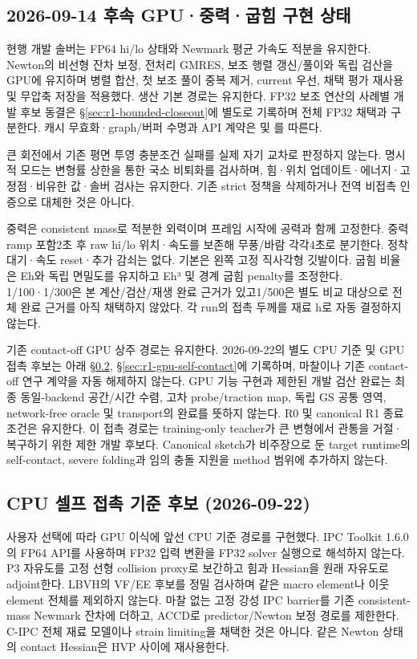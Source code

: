 \documentclass[10pt]{article}
\begin{document}
\subsection{2026-09-14 후속 GPU·중력·굽힘 구현 상태}
\label{sec:r1-gpu-gravity-update}
현행 개발 솔버는 FP64 hi/lo 상태와 Newmark 평균 가속도 적분을 유지한다.
Newton의 비선형 잔차 보정, 전처리 GMRES, 보조 행렬 갱신/풀이와 독립 검산을 GPU에 유지하며
병렬 합산, 첫 보조 풀이 중복 제거, current 우선, 채택 평가 재사용 및 무압축 저장을 적용했다.
생산 기본 경로는 유지한다. FP32 보조 연산의 사례별 개발 후보 동결은
\S\ref{sec:r1-bounded-closeout}에 별도로 기록하며 전체 FP32 채택과 구분한다.
캐시 무효화·graph/버퍼 수명과 API 계약은  및
를 따른다.

큰 회전에서 기존 평면 투영 충분조건 실패를 실제 자기 교차로 판정하지 않는다.
명시적  모드는 변형률 상한을 통한 국소 비퇴화를 검사하며,
힘·위치 업데이트·에너지·고정점·비유한 값·솔버 검사는 유지한다.
기존 strict 정책을 삭제하거나 전역 비접촉 인증으로 대체한 것은 아니다.

중력은 consistent mass로 적분한 외력이며 프레임 시작에 공력과 함께 고정한다.
중력 ramp 포함2초 후 raw hi/lo 위치·속도를 보존해 무풍/바람 각각4초로 분기한다.
정착 대기·속도 reset·추가 감쇠는 없다. 기본은 왼쪽 고정 직사각형 깃발이다.
굽힘 비율은 Eh와 독립 면밀도를 유지하고 Eh³ 및 경계 굽힘 penalty를 조정한다.
1/100·1/300은 본 계산/검산/재생 완료 근거가 있고1/500은 별도 비교 대상으로
전체 완료 근거를 아직 채택하지 않았다. 각 run의 접촉 두께를 재료 h로 자동 결정하지 않는다.

기존 contact-off GPU 상주 경로는 유지한다. 2026-09-22의 별도 CPU 기준 및 GPU 접촉 후보는
아래 \S\ref{sec:r1-cpu-self-contact}, \S\ref{sec:r1-gpu-self-contact}에 기록하며,
마찰이나 기존 contact-off 연구 계약을 자동 해제하지 않는다.
GPU 기능 구현과 제한된 개발 검산 완료는 최종 동일-backend 공간/시간 수렴,
고차 probe/traction map, 독립 GS 공통 영역, network-free oracle 및 transport의 완료를 뜻하지 않는다.
R0 및 canonical R1 종료 조건은 유지한다. 이 접촉 경로는 training-only teacher가 큰 변형에서
관통을 거절·복구하기 위한 제한 개발 후보다. Canonical sketch가 비주장으로 둔 target runtime의
self-contact, severe folding과 임의 충돌 지원을 method 범위에 추가하지 않는다.

\subsection{CPU 셀프 접촉 기준 후보 (2026-09-22)}
\label{sec:r1-cpu-self-contact}
사용자 선택에 따라 GPU 이식에 앞선 CPU 기준 경로를 구현했다. IPC Toolkit 1.6.0의
FP64 API를 사용하며 FP32 입력 변환을 FP32 solver 실행으로 해석하지 않는다.
P3 자유도를 고정 선형 collision proxy로 보간하고 힘과 Hessian을 원래 자유도로 adjoint한다.
LBVH의 VF/EE 후보를 정밀 검사하며 같은 macro element나 이웃 element 전체를 제외하지 않는다.
마찰 없는 고정 강성 IPC barrier를 기존 consistent-mass Newmark 잔차에 더하고,
ACCD로 predictor/Newton 보정 경로를 제한한다. C-IPC 전체 재료 모델이나 strain limiting을
채택한 것은 아니다. 같은 Newton 상태의 contact Hessian은 HVP 사이에 재사용한다.
\end{document}
